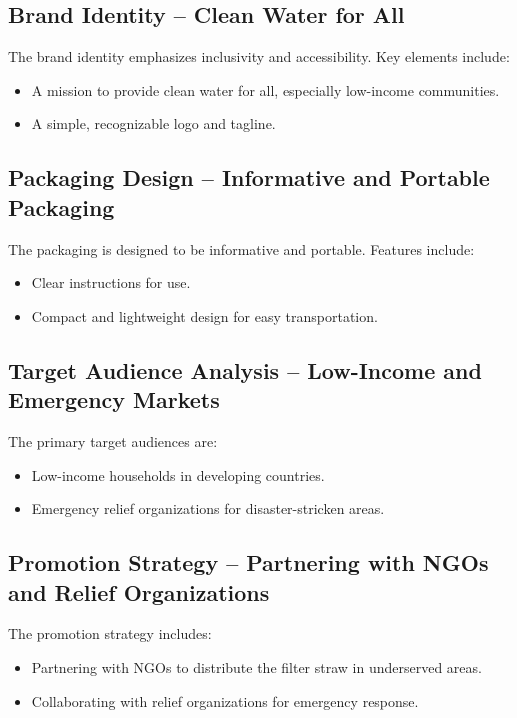 \documentclass{article}
\begin{document}
\vspace{0.5cm}

\subsection{Brand Identity – Clean Water for All}
The brand identity emphasizes inclusivity and accessibility. Key elements include:
\begin{itemize}
    \item A mission to provide clean water for all, especially low-income communities.
    \item A simple, recognizable logo and tagline.
\end{itemize}

\vspace{0.5cm}

\subsection{Packaging Design – Informative and Portable Packaging}
The packaging is designed to be informative and portable. Features include:
\begin{itemize}
    \item Clear instructions for use.
    \item Compact and lightweight design for easy transportation.
\end{itemize}

\vspace{0.5cm}

\subsection{Target Audience Analysis – Low-Income and Emergency Markets}
The primary target audiences are:
\begin{itemize}
    \item Low-income households in developing countries.
    \item Emergency relief organizations for disaster-stricken areas.
\end{itemize}

\vspace{0.5cm}

\subsection{Promotion Strategy – Partnering with NGOs and Relief Organizations}
The promotion strategy includes:
\begin{itemize}
    \item Partnering with NGOs to distribute the filter straw in underserved areas.
    \item Collaborating with relief organizations for emergency response.
\end{itemize}
\end{document}
